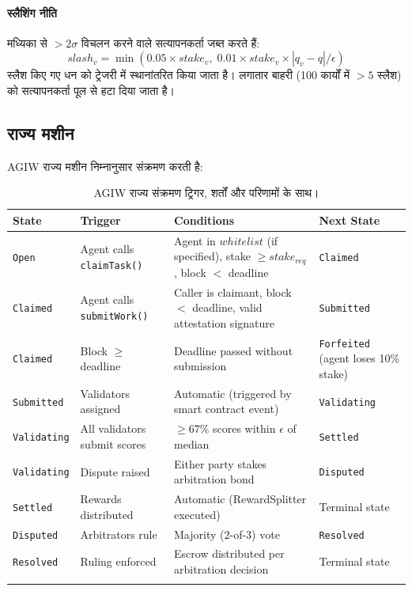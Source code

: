 \documentclass[11pt]{article}
\begin{document}
\begin{itemize}[noitemsep]
\begin{itemize}[noitemsep]
\paragraph{स्लैशिंग नीति} मध्यिका से $>2\sigma$ विचलन करने वाले सत्यापनकर्ता जब्त करते हैं:
\begin{equation}
slash_v = \min(0.05 \times stake_v, \; 0.01 \times stake_v \times |q_v - q| / \epsilon)
\end{equation}
स्लैश किए गए धन को ट्रेजरी में स्थानांतरित किया जाता है। लगातार बाहरी (100 कार्यों में $>5$ स्लैश) को सत्यापनकर्ता पूल से हटा दिया जाता है।

\subsection{राज्य मशीन}
\label{sec:agiw-state-machine}
AGIW राज्य मशीन निम्नानुसार संक्रमण करती है:
\begin{longtable}{@{}p{}p{}p{}p{}@{}}
\toprule
\textbf{State} & \textbf{Trigger} & \textbf{Conditions} & \textbf{Next State} \\\midrule
\texttt{Open} & Agent calls \texttt{claimTask()} & Agent in $whitelist$ (if specified), stake $\geq stake_{req}$, block $<$ deadline & \texttt{Claimed} \\
\texttt{Claimed} & Agent calls \texttt{submitWork()} & Caller is claimant, block $<$ deadline, valid attestation signature & \texttt{Submitted} \\
\texttt{Claimed} & Block $\geq$ deadline & Deadline passed without submission & \texttt{Forfeited} (agent loses 10\% stake) \\
\texttt{Submitted} & Validators assigned & Automatic (triggered by smart contract event) & \texttt{Validating} \\
\texttt{Validating} & All validators submit scores & $\geq 67\%$ scores within $\epsilon$ of median & \texttt{Settled} \\
\texttt{Validating} & Dispute raised & Either party stakes arbitration bond & \texttt{Disputed} \\
\texttt{Settled} & Rewards distributed & Automatic (RewardSplitter executed) & Terminal state \\
\texttt{Disputed} & Arbitrators rule & Majority (2-of-3) vote & \texttt{Resolved} \\
\texttt{Resolved} & Ruling enforced & Escrow distributed per arbitration decision & Terminal state \\\bottomrule
\caption{AGIW राज्य संक्रमण ट्रिगर, शर्तों और परिणामों के साथ।}
\label{tab:agiw-states}
\end{longtable}


\end{itemize}
\end{itemize}
\end{document}

